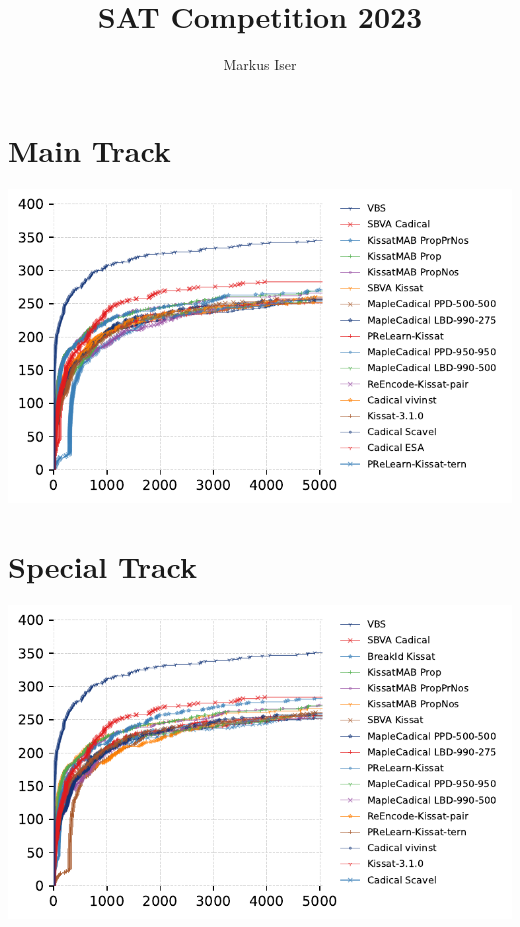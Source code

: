 \documentclass{article}
\date{}
\title{SAT Competition 2023}
\author{Markus Iser}
\begin{document}
\maketitle

\section{Main Track}
\includegraphics[width=\linewidth]{gen/sc2023/main/cdf.pdf}



\section{Special Track}
\includegraphics[width=\linewidth]{gen/sc2023/special/cdf.pdf}


\end{document}
